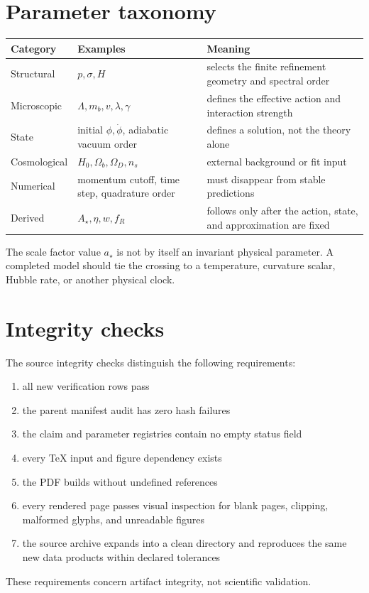 \section{Parameter taxonomy}

\begin{longtable}{@{}P{0.20\textwidth}P{0.25\textwidth}P{0.45\textwidth}@{}}
\toprule
Category & Examples & Meaning\\
\midrule
Structural & \(p,\sigma,H\) & selects the finite refinement geometry and spectral order\\
Microscopic & \(\Lambda,m_b,v,\lambda,\gamma\) & defines the effective action and interaction strength\\
State & initial \(\phi,\dot\phi\), adiabatic vacuum order & defines a solution, not the theory alone\\
Cosmological & \(H_0,\Omega_b,\Omega_D,n_s\) & external background or fit input\\
Numerical & momentum cutoff, time step, quadrature order & must disappear from stable predictions\\
Derived & \(A_\star,\eta,w,f_R\) & follows only after the action, state, and approximation are fixed\\
\bottomrule
\end{longtable}

The scale factor value \(a_\star\) is not by itself an invariant physical parameter.  A completed model should tie the crossing to a temperature, curvature scalar, Hubble rate, or another physical clock.

\section{Integrity checks}

The source integrity checks distinguish the following requirements:
\begin{enumerate}[leftmargin=2.2em]
\item all new verification rows pass
\item the parent manifest audit has zero hash failures
\item the claim and parameter registries contain no empty status field
\item every TeX input and figure dependency exists
\item the PDF builds without undefined references
\item every rendered page passes visual inspection for blank pages, clipping, malformed glyphs, and unreadable figures
\item the source archive expands into a clean directory and reproduces the same new data products within declared tolerances
\end{enumerate}

These requirements concern artifact integrity, not scientific validation.
